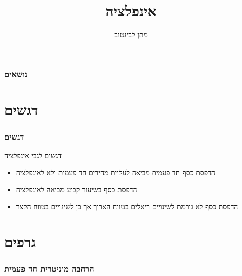 \documentclass[usenames,dvipsnames]{beamer}
\title[]{אינפלציה}
\author{מתן לבינטוב}
\institute[{{ אב"ג}}]{{ אוניברסיטת בן גוריון בנגב}}
\begin{document}
\begin{RTL}
\begin{frame}
\titlepage
\end{frame}
\begin{frame}
    \frametitle{נושאים}
    \tableofcontents

    

\end{frame}

\section{דגשים}
\begin{frame}
    \frametitle{דגשים}
    \begin{block}{דגשים לגבי אינפלציה}
        \begin{itemize}
            \item הדפסת כסף חד פעמית מביאה לעליית מחירים חד פעמית ולא לאינפלציה
            \item הדפסת כסף בשיעור קבוע מביאה לאינפלציה
            \item הדפסת כסף לא גורמת לשינויים ריאלים בטווח הארוך אך כן לשינויים בטווח הקצר
        \end{itemize}
    \end{block}
    

\end{frame}

\section{גרפים}
\begin{frame}[allowframebreaks]
    \frametitle{הרחבה מוניטרית חד פעמית}
    \begin{center}
\end{center}
\end{frame}
\end{RTL}
\end{document}
